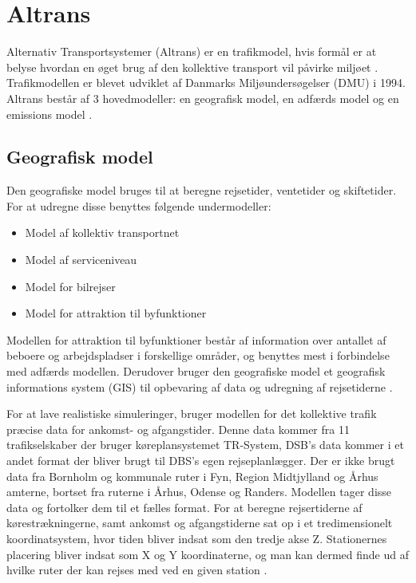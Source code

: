 \section{Altrans}
Alternativ Transportsystemer (Altrans) er en trafikmodel, hvis formål er at belyse hvordan en øget brug af den kollektive transport vil påvirke miljøet \cite[s. 14]{dmumodelanalyser}. Trafikmodellen er blevet udviklet af Danmarks Miljøundersøgelser (DMU) i 1994. Altrans består af 3 hovedmodeller: en geografisk model, en adfærds model og en emissions model \cite[s. 14]{dmuadfaerdsmodel}.
\subsection{Geografisk model}
Den geografiske model bruges til at beregne rejsetider, ventetider og skiftetider. For at udregne disse benyttes følgende undermodeller:

\begin{itemize}
\item Model af kollektiv transportnet
\item Model af serviceniveau
\item Model for bilrejser
\item Model for attraktion til byfunktioner
\end{itemize}

Modellen for attraktion til byfunktioner består af information over antallet af beboere og arbejdspladser i forskellige områder, og benyttes mest i forbindelse med adfærds modellen. Derudover bruger den geografiske model et geografisk informations system (GIS) til opbevaring af data og udregning af rejsetiderne \cite[s. 18-19]{dmumodelanalyser}.

\vspace{5mm}

For at lave realistiske simuleringer, bruger modellen for det kollektive trafik præcise data for ankomst- og afgangstider. Denne data kommer fra 11 trafikselskaber der bruger køreplansystemet TR-System, DSB’s data kommer i et andet format der bliver brugt til DBS’s egen rejseplanlægger. Der er ikke brugt data fra Bornholm og kommunale ruter i Fyn, Region Midtjylland og Århus amterne, bortset fra ruterne i Århus, Odense og Randers. Modellen tager disse data og fortolker dem til et fælles format. For at beregne rejsertiderne af kørestrækningerne, samt ankomst og afgangstiderne sat op i et tredimensionelt koordinatsystem, hvor tiden bliver indsat som den tredje akse Z. Stationernes placering bliver indsat som X og Y koordinaterne, og man kan dermed finde ud af hvilke ruter der kan rejses med ved en given station \cite[s. 20-22]{dmumodelanalyser}.

